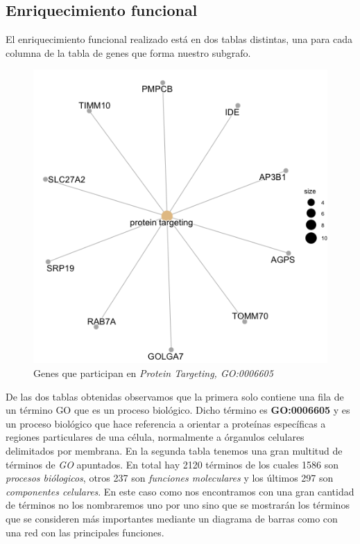 \subsection{Enriquecimiento funcional}

El enriquecimiento funcional realizado est\'a en dos tablas distintas, una para cada columna de la tabla de genes que forma nuestro subgrafo.\newline
\begin{figure}[ht!]
	\centering
	\includegraphics[scale = 0.2]{figures/GenesProteinTargeting.png}
	\caption{Genes que participan en \textit{Protein Targeting, GO:0006605}}
\end{figure}
De las dos tablas obtenidas observamos que la primera solo contiene una fila de un t\'ermino GO que es un proceso biol\'ogico. Dicho t\'ermino es \textbf{GO:0006605} y es un proceso biol\'ogico que hace referencia a orientar a prote\'inas espec\'ificas a regiones particulares de una c\'elula, normalmente a \'organulos celulares delimitados por membrana.
En la segunda tabla tenemos una gran multitud de t\'erminos de \textit{GO} apuntados. En total hay 2120 t\'erminos de los cuales 1586 son \textit{procesos bi\'ologicos}, otros 237 son \textit{funciones moleculares} y los \'ultimos 297 son \textit{componentes celulares}.\newline
En este caso como nos encontramos con una gran cantidad de t\'erminos no los nombraremos uno por uno sino que se mostrar\'an los t\'erminos que se consideren m\'as importantes mediante un diagrama de barras como con una red con las principales funciones. \newline
